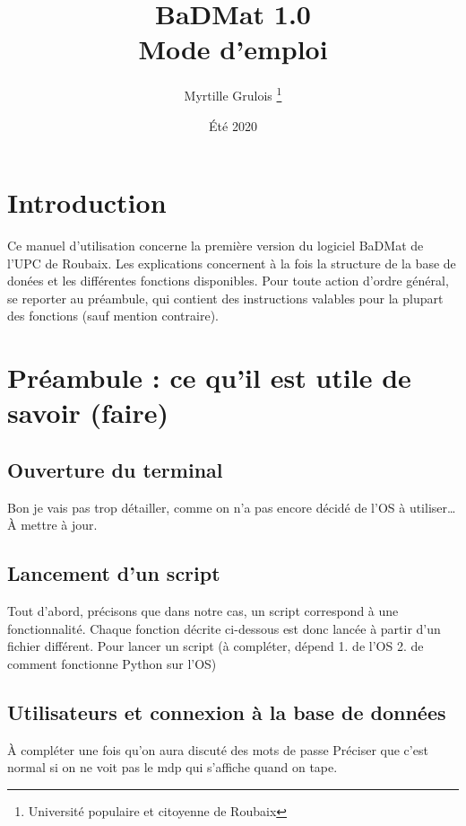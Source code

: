 \documentclass[12pt,a4paper]{article}
\title{\Huge BaDMat 1.0 \\ \LARGE Mode d'emploi} %
\author{Myrtille Grulois \thanks{Université populaire et citoyenne de Roubaix}}
\date{Été 2020}
\begin{document}
\begin{titlepage}
\maketitle
\end{titlepage}

\tableofcontents
\clearpage

\section*{Introduction}

Ce manuel d'utilisation concerne la première version du logiciel BaDMat de l'UPC de Roubaix.
Les explications concernent à la fois la structure de la base de donées et les différentes fonctions disponibles.
Pour toute action d'ordre général, se reporter au préambule, qui contient des instructions valables pour la plupart des fonctions (sauf mention contraire).

\bigskip
\section{Préambule : ce qu'il est utile de savoir (faire)}

\subsection{Ouverture du terminal}

    Bon je vais pas trop détailler, comme on n'a pas encore décidé de l'OS à utiliser\dots
    À mettre à jour.


\bigskip
\subsection{Lancement d'un script}
    Tout d'abord, précisons que dans notre cas, un script correspond à une fonctionnalité.
    Chaque fonction décrite ci-dessous est donc lancée à partir d'un fichier différent.
    Pour lancer un script (à compléter, dépend 1. de l'OS 2. de comment fonctionne Python sur l'OS)


\bigskip
\subsection{Utilisateurs et connexion à la base de données}
    À compléter une fois qu'on aura discuté des mots de passe
    Préciser que c'est normal si on ne voit pas le mdp qui s'affiche quand on tape.
\end{document}
